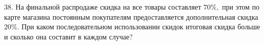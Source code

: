 38. На финальной распродаже скидка на все товары составляет $70\%,$ при этом по карте магазина постоянным покупателям предоставляется дополнительная скидка $20\%.$ При каком последовательном использовании скидок итоговая скидка больше и сколько она составит в каждом случае?\\
